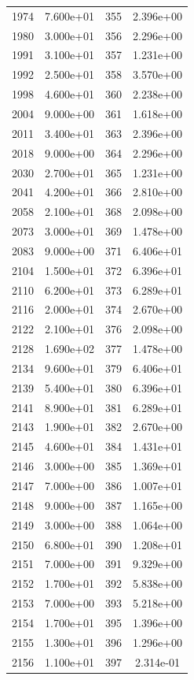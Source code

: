 \documentclass[12pt]{article}
\begin{document}
\begin{longtable}{@{}cccc@{}}
1974 & 7.600e+01 & 355 & 2.396e+00 \\
1980 & 3.000e+01 & 356 & 2.296e+00 \\
1991 & 3.100e+01 & 357 & 1.231e+00 \\
1992 & 2.500e+01 & 358 & 3.570e+00 \\
1998 & 4.600e+01 & 360 & 2.238e+00 \\
2004 & 9.000e+00 & 361 & 1.618e+00 \\
2011 & 3.400e+01 & 363 & 2.396e+00 \\
2018 & 9.000e+00 & 364 & 2.296e+00 \\
2030 & 2.700e+01 & 365 & 1.231e+00 \\
2041 & 4.200e+01 & 366 & 2.810e+00 \\
2058 & 2.100e+01 & 368 & 2.098e+00 \\
2073 & 3.000e+01 & 369 & 1.478e+00 \\
2083 & 9.000e+00 & 371 & 6.406e+01 \\
2104 & 1.500e+01 & 372 & 6.396e+01 \\
2110 & 6.200e+01 & 373 & 6.289e+01 \\
2116 & 2.000e+01 & 374 & 2.670e+00 \\
2122 & 2.100e+01 & 376 & 2.098e+00 \\
2128 & 1.690e+02 & 377 & 1.478e+00 \\
2134 & 9.600e+01 & 379 & 6.406e+01 \\
2139 & 5.400e+01 & 380 & 6.396e+01 \\
2141 & 8.900e+01 & 381 & 6.289e+01 \\
2143 & 1.900e+01 & 382 & 2.670e+00 \\
2145 & 4.600e+01 & 384 & 1.431e+01 \\
2146 & 3.000e+00 & 385 & 1.369e+01 \\
2147 & 7.000e+00 & 386 & 1.007e+01 \\
2148 & 9.000e+00 & 387 & 1.165e+00 \\
2149 & 3.000e+00 & 388 & 1.064e+00 \\
2150 & 6.800e+01 & 390 & 1.208e+01 \\
2151 & 7.000e+00 & 391 & 9.329e+00 \\
2152 & 1.700e+01 & 392 & 5.838e+00 \\
2153 & 7.000e+00 & 393 & 5.218e+00 \\
2154 & 1.700e+01 & 395 & 1.396e+00 \\
2155 & 1.300e+01 & 396 & 1.296e+00 \\
2156 & 1.100e+01 & 397 & 2.314e-01 \\

\end{longtable}
\end{document}
